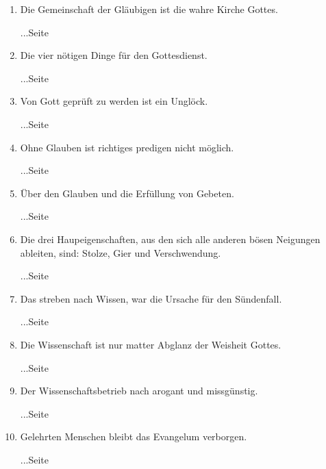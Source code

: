\begin{enumerate}
 \item Die Gemeinschaft der Gläubigen ist die wahre Kirche Gottes.
 \begin{flushright}...Seite \pageref{ref:06_12_wahre_kirche}\end{flushright}
 \item Die vier nötigen Dinge für den Gottesdienst.
 \begin{flushright}...Seite \pageref{ref:06_13_vier_noetige_dinge}\end{flushright}
 \item Von Gott geprüft zu werden ist ein Unglöck.
 \begin{flushright}...Seite \pageref{ref:06_13_auf_die_probe_gestellt}\end{flushright}
 \item Ohne Glauben ist richtiges predigen nicht möglich.
 \begin{flushright}...Seite \pageref{ref:06_14_predigt}\end{flushright}
 \item Über den Glauben und die Erfüllung von Gebeten.
 \begin{flushright}...Seite \pageref{ref:06_14_gebetserfuellung}\end{flushright}
 \item Die drei Haupeigenschaften, aus den sich alle anderen bösen Neigungen ableiten, sind: Stolze, Gier und Verschwendung.
 \begin{flushright}...Seite \pageref{ref:07_01_drei_haupteigenschaften}\end{flushright}
 \item Das streben nach Wissen, war die Ursache für den Sündenfall. 
 \begin{flushright}...Seite \pageref{ref:07_03_wissen_erbsuende}\end{flushright}
 \item Die Wissenschaft ist nur matter Abglanz der Weisheit Gottes.
 \begin{flushright}...Seite \pageref{ref:07_03_wissen_erbsuende}\end{flushright}
 \item Der Wissenschaftsbetrieb nach arogant und missgünstig.
 \begin{flushright}...Seite \pageref{ref:07_06_wissenschaft}\end{flushright}
 \item Gelehrten Menschen bleibt das Evangelum verborgen.
 \begin{flushright}...Seite \pageref{ref:07_13_gelehrte}\end{flushright}

\end{enumerate}
